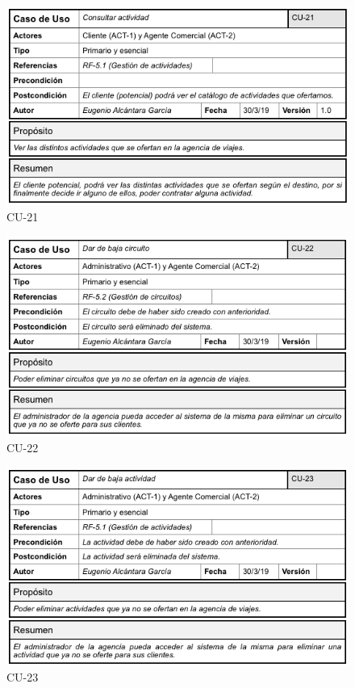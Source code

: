 \documentclass{article}
\begin{document}
	\begin{figure}[H]
		\centering
		\includegraphics[totalheight=8cm]{CU-21}
		\caption{CU-21}
		\label{fig:cu-21}
	\end{figure}

	\begin{figure}[H]
		\centering
		\includegraphics[totalheight=8cm]{CU-22}
		\caption{CU-22}
		\label{fig:cu-22}
	\end{figure}

	\begin{figure}[H]
		\centering
		\includegraphics[totalheight=8cm]{CU-23}
		\caption{CU-23}
		\label{fig:cu-23}
	\end{figure}
\end{document}

